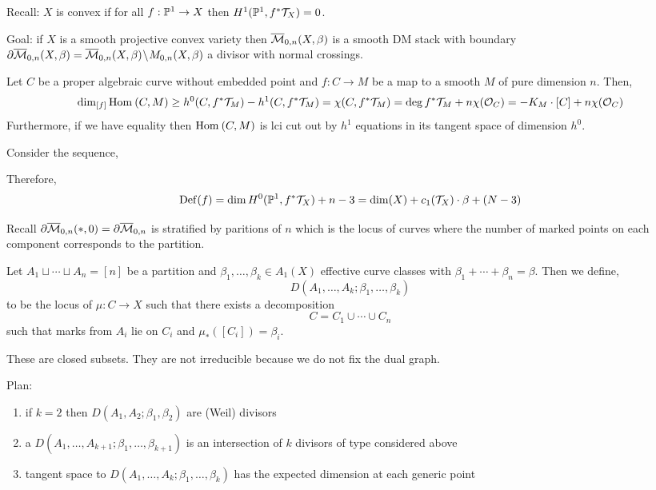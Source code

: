 \documentclass[12pt]{article}
\begin{document}
Recall: $X$ is convex if for all $f : \P^1 \to X$ then $H^1(\P^1, f^* \T_X) = 0$. 


Goal: if $X$ is a smooth projective convex variety then $\ol{\M}_{0,n}(X, \beta)$ is a smooth DM stack with boundary $\partial \ol{\M}_{0,n}(X, \beta) = \ol{\M}_{0,n}(X, \beta) \sm M_{0,n}(X, \beta)$ a divisor with normal crossings.

\begin{theorem}
Let $C$ be a proper algebraic curve without embedded point and $f : C \to M$ be a map to a smooth $M$ of pure dimension $n$. Then,
\[ \dim_{[f]} \Hom{}{C}{M} \ge h^0(C, f^* \T_M) - h^1(C, f^* \T_M) = \chi(C, f^* \T_M) =  \deg{f^* \T_M} + n \chi(\struct{C}) = - K_M \cdot [C] + n \chi(\struct{C}) \]
Furthermore, if we have equality then $\Hom{}{C}{M}$ is lci cut out by $h^1$ equations in its tangent space of dimension $h^0$.
\end{theorem}

\newcommand{\Def}{\mathrm{Def}}

Consider the sequence,
\begin{center}
\end{center}
Therefore, 
\[ \Def(f) = \dim H^0(\P^1, f^* \T_X) + n - 3 = \dim(X) + c_1(\T_X) \cdot \beta + (N-3) \]


Recall $\partial \ol{\M}_{0,n}(*, 0) = \partial \ol{\M}_{0,n}$ is stratified by paritions of $n$ which is the locus of curves where the number of marked points on each component corresponds to the partition.

\begin{defn}
Let $A_1 \sqcup \cdots \sqcup A_n = [n]$ be a partition and $\beta_1, \dots, \beta_k \in A_1(X)$ effective curve classes with $\beta_1 + \cdots + \beta_n = \beta$. Then we define,
\[ D(A_1, \dots, A_k ; \beta_1, \dots, \beta_k) \]
to be the locus of $\mu : C \to X$ such that there exists a decomposition
\[ C = C_1 \cup \cdots \cup C_n \]
such that marks from $A_i$ lie on $C_i$ and $\mu_*([C_i]) = \beta_i$. 
\end{defn}

These are closed subsets. They are not irreducible because we do not fix the dual graph. 

Plan:

\begin{enumerate}
\item if $k = 2$ then $D(A_1, A_2 ; \beta_1, \beta_2)$ are (Weil) divisors
\item a $D(A_1, \dots, A_{k+1} ; \beta_1, \dots, \beta_{k+1})$ is an intersection of $k$ divisors of type considered above
\item tangent space to $D(A_1, \dots, A_k ; \beta_1, \dots, \beta_k)$ has the expected dimension at each generic point
\end{enumerate}
\end{document}
